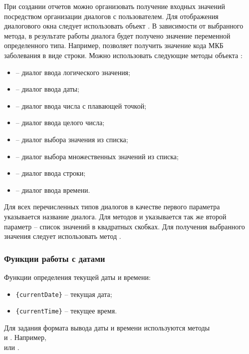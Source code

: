 При создании отчетов можно организовать получение входных значений посредством организации диалогов с пользователем. Для отображения диалогового окна следует использовать объект . В зависимости от выбранного метода, в результате работы диалога будет получено значение переменной определенного типа. Например,  позволяет получить значение кода МКБ заболевания в виде строки. Можно использовать следующие методы объекта :
\begin{itemize}
 \item {} – диалог ввода логического значения;
 \item {} – диалог ввода даты;
 \item {} – диалог ввода числа с плавающей точкой;
 \item {} – диалог ввода целого числа;
 \item {} – диалог выбора значения из списка;
 \item {} – диалог выбора множественных значений из списка;
 \item {} – диалог ввода строки;
 \item {} – диалог ввода времени.
\end{itemize}
 
Для всех перечисленных типов диалогов в качестве первого параметра указывается название диалога. Для методов  и  указывается так же второй параметр – список значений в квадратных скобках. Для получения выбранного значения следует использовать метод .

\subsubsection{Функции работы с датами}

Функции определения текущей даты и времени:
\begin{itemize}
 \item \verb|{currentDate}| – текущая дата;
 \item \verb|{currentTime}| – текущее время.
\end{itemize}
 
Для задания формата вывода даты и времени используются методы \\  и . Например, \\  или  .

